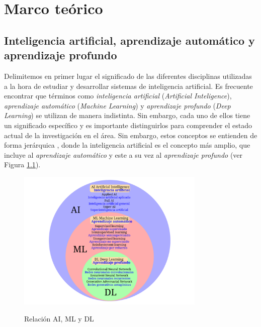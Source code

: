 \chapter{Marco teórico}

\section{Inteligencia artificial, aprendizaje automático y aprendizaje profundo}

Delimitemos en primer lugar el significado de las diferentes disciplinas utilizadas a la hora de estudiar y desarrollar sistemas de inteligencia artificial. Es frecuente encontrar que términos como \textit{inteligencia artificial} (\textit{Artificial Inteligence}), \textit{aprendizaje automático} (\textit{Machine Learning}) y \textit{aprendizaje profundo} (\textit{Deep Learning}) se utilizan de manera indistinta. Sin embargo, cada uno de ellos tiene un significado específico y es importante distinguirlos para comprender el estado actual de la investigación en el área. Sin embargo, estos conceptos se entienden de forma jerárquica \citep{torresivinalsPythonDeepLearning2020}, donde la inteligencia artificial es el concepto más amplio, que incluye al \textit{aprendizaje automático} y este a su vez al \textit{aprendizaje profundo} (ver Figura \ref{fig:ai_ml_dl}).


\begin{figure}[]
    \caption{Relación AI, ML y DL}
    \centering
    \includegraphics[width=0.8\textwidth]{./figuras/AI_ML_DL.png}
    \label{fig:ai_ml_dl}
\end{figure}



